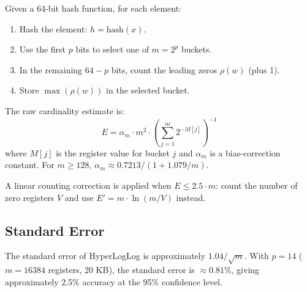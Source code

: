Given a 64-bit hash function, for each element:
\begin{enumerate}
    \item Hash the element: $h = \text{hash}(x)$.
    \item Use the first $p$ bits to select one of $m = 2^p$ buckets.
    \item In the remaining $64 - p$ bits, count the leading zeros $\rho(w)$ (plus 1).
    \item Store $\max(\rho(w))$ in the selected bucket.
\end{enumerate}

The raw cardinality estimate is:
\[
E = \alpha_m \cdot m^2 \cdot \left( \sum_{j=1}^{m} 2^{-M[j]} \right)^{-1}
\]
where $M[j]$ is the register value for bucket $j$ and $\alpha_m$ is a bias-correction constant. For $m \ge 128$, $\alpha_m \approx 0.7213 / (1 + 1.079 / m)$.

A linear counting correction is applied when $E \le 2.5 \cdot m$: count the number of zero registers $V$ and use $E' = m \cdot \ln(m / V)$ instead.

\subsection{Standard Error}

The standard error of HyperLogLog is approximately $1.04 / \sqrt{m}$. With $p = 14$ ($m = 16384$ registers, 20 KB), the standard error is $\approx 0.81\%$, giving approximately 2.5\% accuracy at the 95\% confidence level.


